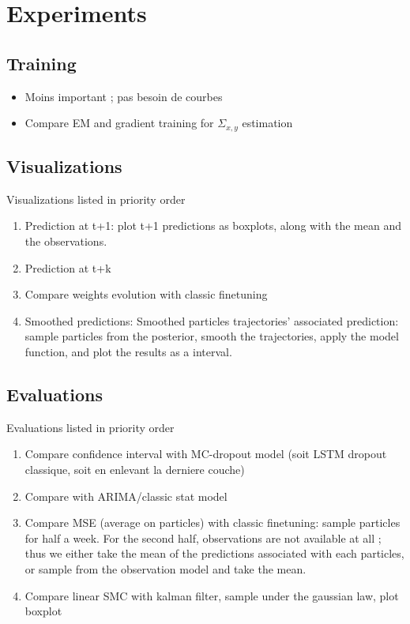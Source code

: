 \documentclass{article}
\begin{document}
\section{Experiments}
\label{sec:exp}

\subsection{Training}%
\label{sub:training}

\begin{itemize}
	\item Moins important ; pas besoin de courbes
	\item Compare EM and gradient training for $\Sigma_{x, y}$ estimation
\end{itemize}

\subsection{Visualizations}%
\label{sub:visualizations}

Visualizations listed in priority order
\begin{enumerate}
	\item Prediction at t+1: plot t+1 predictions as boxplots, along with the mean and the observations.
	\item Prediction at t+k
	\item Compare weights evolution with classic finetuning
	\item Smoothed predictions: Smoothed particles trajectories' associated prediction: sample particles from the posterior, smooth the trajectories, apply the model function, and plot the results as a interval.
\end{enumerate}

\subsection{Evaluations}%
\label{sub:evaluations}

Evaluations listed in priority order
\begin{enumerate}
	\item Compare confidence interval with MC-dropout model (soit LSTM dropout classique, soit en enlevant la derniere couche)
	\item Compare with ARIMA/classic stat model
	\item Compare MSE (average on particles) with classic finetuning: sample particles for half a week. For the second half, observations are not available at all ; thus we either take the mean of the predictions associated with each particles, or sample from the observation model and take the mean.
	\item Compare linear SMC with kalman filter, sample under the gaussian law, plot boxplot
\end{enumerate}
\end{document}
